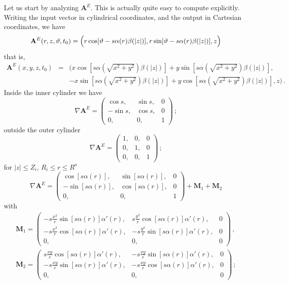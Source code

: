 \documentclass[12pt,twoside]{article}
\newcommand{\bA}{\mathbf{A}}
\def \al{\alpha}  \def \be{\beta}    \def \ga{\gamma}
\newcommand {\bM}{{\mathbf{M}}}
\begin{document}
Let us start by analyzing $\bA^E$.  This is actually quite easy to
compute explicitly.
Writing the input vector in cylindrical coordinates, and the output
in Cartesian coordinates, we have
$$
\bA^E(r,z,\vt, t_0) = \Big(r \cos [\vt - s \al (r)\be (|z|)], 
r \sin[\vt - s \al (r) \be (|z|) ], z\Big)
$$
that is,
$$
\begin{array}{lcr}
\bA^E(x,y,z,t_0)& = &\Big( x \cos[s \al (\sqrt{x^2+ y^2})\be (|z|)]
 +  y \sin[s \al (\sqrt{x^2+ y^2})\be (|z|) ], \\[4pt]
& & -x \sin[s \al (\sqrt{x^2+ y^2})\be (|z|)] + y \cos[s \al (\sqrt{x^2+ y^2})
\be (|z|) ] , z \Big)\, .
\end{array}
$$
Inside the inner cylinder we have
$$
\nabla \bA^E =
\left( \begin{array}{ccc}
\cos s, & \sin s, & 0 \\
-\sin s, & \cos s, & 0 \\
0, & 0, & 1 \end{array} \right)\, ;
$$
outside the outer cylinder
$$
\nabla \bA^E =
\left( \begin{array}{ccc}
1, & 0, & 0 \\
0, & 1, & 0 \\
0, & 0, & 1 \end{array} \right)\, ;
$$
for $|z|\leq Z_i$, $R_i \leq r\leq R^o$
$$
\nabla \bA^E =
\left( \begin{array}{ccc}
\cos [s \al (r) ], & \sin [s \al (r) ],  & 0 \\
-\sin [s \al (r)], & \cos [s \al (r) ] , & 0 \\
0, & 0,& 1 \end{array} \right) + \bM_1 +\bM_2
$$
with 
$$
\begin{array}{l}
\bM_1 =
\left( \begin{array}{ccc}
- s\frac{x^2}{r} \sin [s\al (r)]\al'(r), &
s\frac{y^2}{r} \cos [s\al (r)]\al'(r), & 0 \\
-s\frac{x^2}{r} \cos [s\al (r)]\al'(r), & - s\frac{y^2}{r} 
\sin [s\al (r)]\al'(r), & 0 \\
0, & 0, & 0 \end{array} \right)\, ,
\\[6pt]
\bM_2 =
\left( \begin{array}{ccc}
s\frac{xy}{r} \cos [s\al (r)]\al'(r), & - s\frac{xy}{r} 
\sin [s\al (r)]\al'(r), & 0 \\
- s\frac{xy}{r} \sin [s\al (r)]\al'(r), & 
-s\frac{xy}{r} \cos [s\al (r)]\al'(r), & 0 \\
0, & 0, & 0 \end{array} \right)\, ;
\end{array}
$$
\end{document}
